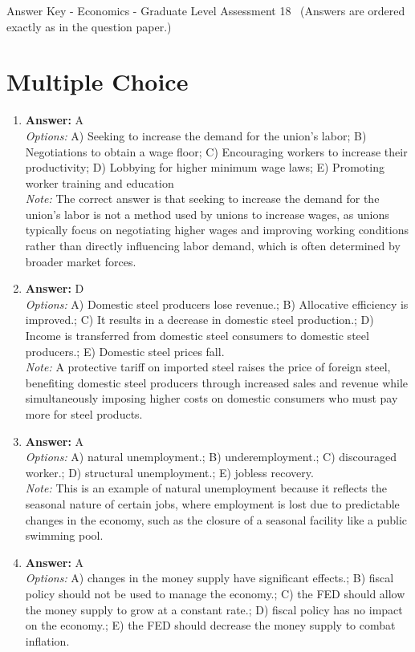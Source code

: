 \documentclass[12pt]{article}
\begin{document}
\begin{center}
Answer Key - Economics - Graduate Level Assessment 18 \
\small (Answers are ordered exactly as in the question paper.)
\end{center}

\section*{Multiple Choice}
\begin{enumerate}[label=\arabic*.]
\item \textbf{Answer:} A
\\ \textit{Options:} A) Seeking to increase the demand for the union's labor; B) Negotiations to obtain a wage floor; C) Encouraging workers to increase their productivity; D) Lobbying for higher minimum wage laws; E) Promoting worker training and education
\\ \textit{Note:} The correct answer is that seeking to increase the demand for the union's labor is not a method used by unions to increase wages, as unions typically focus on negotiating higher wages and improving working conditions rather than directly influencing labor demand, which is often determined by broader market forces.
\item \textbf{Answer:} D
\\ \textit{Options:} A) Domestic steel producers lose revenue.; B) Allocative efficiency is improved.; C) It results in a decrease in domestic steel production.; D) Income is transferred from domestic steel consumers to domestic steel producers.; E) Domestic steel prices fall.
\\ \textit{Note:} A protective tariff on imported steel raises the price of foreign steel, benefiting domestic steel producers through increased sales and revenue while simultaneously imposing higher costs on domestic consumers who must pay more for steel products.
\item \textbf{Answer:} A
\\ \textit{Options:} A) natural unemployment.; B) underemployment.; C) discouraged worker.; D) structural unemployment.; E) jobless recovery.
\\ \textit{Note:} This is an example of natural unemployment because it reflects the seasonal nature of certain jobs, where employment is lost due to predictable changes in the economy, such as the closure of a seasonal facility like a public swimming pool.
\item \textbf{Answer:} A
\\ \textit{Options:} A) changes in the money supply have significant effects.; B) fiscal policy should not be used to manage the economy.; C) the FED should allow the money supply to grow at a constant rate.; D) fiscal policy has no impact on the economy.; E) the FED should decrease the money supply to combat inflation.

\end{enumerate}
\end{document}
